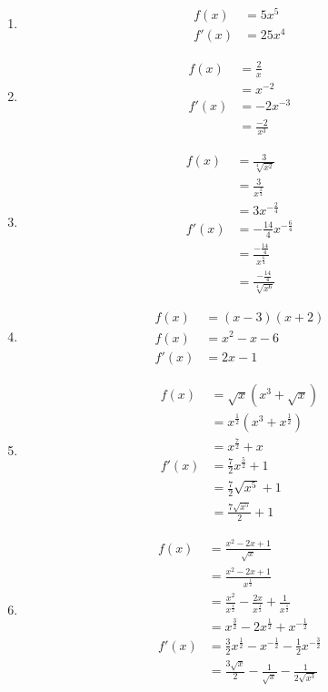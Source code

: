 \begin{enumerate}
	\item
	\begin{align*}
		f(x) &= 5x^5\\
		f'(x) &= 25x^4
	\end{align*}
	\item
	\begin{align*}
		f(x) &= \frac{2}{x}\\
		&= x^{-2}\\
		f'(x) &= -2x^{-3}\\
		&= \frac{-2}{x^3}
	\end{align*}
	\item 
	\begin{align*}
		f(x) &= \frac{3}{\sqrt[4]{x^2}}\\
		&= \frac{3}{x^{\frac{2}{4}}}\\
		&= 3x^{-\frac{2}{4}}\\
		f'(x) &= -\frac{14}{4}x^{-\frac{6}{4}}\\[0.5em]
		&= \frac{-\frac{14}{4}}{x^{\frac{6}{4}}}\\[0.5em]
		&= \frac{-\frac{14}{4}}{\sqrt[4]{x^6}}
	\end{align*}
	\item
	\begin{align*}
		f(x)&=(x-3)(x+2)\\
		f(x)&=x^2-x-6\\
		f'(x)&=2x-1
	\end{align*}
	\item
	\begin{align*}
		f(x) &= \sqrt{x} \left(x^3 + \sqrt{x} \right)\\
		&= x^{\frac{1}{2}} \left(x^3+x^{\frac{1}{2}}\right)\\
		&= x^{\frac{7}{2}} + x\\
		f'(x) &= \frac{7}{2}x^{\frac{5}{2}}+1\\
		&= \frac{7}{2} \sqrt{x^5} + 1\\
		&= \frac{7 \sqrt{x^5}}{2} + 1
	\end{align*}
	\item
	\begin{align*}
		f(x) &= \frac{x^2 - 2x + 1}{\sqrt{x}}\\
		&= \frac{x^2 - 2x + 1}{x^{\frac{1}{2}}}\\
		&= \frac{x^2}{x^{\frac{1}{2}}} - \frac{2x}{x^{\frac{1}{2}}} + \frac{1}{x^{\frac{1}{2}}}\\
		&= x^{\frac{3}{2}} - 2x^{\frac{1}{2}} + x^{-\frac{1}{2}}\\
		f'(x) &= \frac{3}{2}x^{\frac{1}{2}} - x^{-\frac{1}{2}} - \frac{1}{2}x^{-\frac{3}{2}}\\
		&= \frac{3\sqrt{x}}{2} - \frac{1}{\sqrt{x}} - \frac{1}{2\sqrt{x^3}}
	\end{align*}
\end{enumerate}


